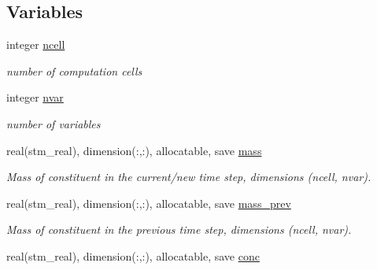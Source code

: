 \subsection*{Variables}
\begin{CompactItemize}
\item 
\hypertarget{a00070_d30ffe89b9bf19b7ebd4959610c0668e}{
integer \hyperlink{a00070_d30ffe89b9bf19b7ebd4959610c0668e}{ncell}}
\label{a00070_d30ffe89b9bf19b7ebd4959610c0668e}

\begin{CompactList}\small\item\em number of computation cells \item\end{CompactList}\item 
\hypertarget{a00070_85a0e44203c92854cc05d8525ad1d214}{
integer \hyperlink{a00070_85a0e44203c92854cc05d8525ad1d214}{nvar}}
\label{a00070_85a0e44203c92854cc05d8525ad1d214}

\begin{CompactList}\small\item\em number of variables \item\end{CompactList}\item 
\hypertarget{a00070_b3bc6dc073e275aa5cf32ffe5a9b0b6c}{
real(stm\_\-real), dimension(:,:), allocatable, save \hyperlink{a00070_b3bc6dc073e275aa5cf32ffe5a9b0b6c}{mass}}
\label{a00070_b3bc6dc073e275aa5cf32ffe5a9b0b6c}

\begin{CompactList}\small\item\em Mass of constituent in the current/new time step, dimensions (ncell, nvar). \item\end{CompactList}\item 
\hypertarget{a00070_de9ce87321125474059d20826b7835b2}{
real(stm\_\-real), dimension(:,:), allocatable, save \hyperlink{a00070_de9ce87321125474059d20826b7835b2}{mass\_\-prev}}
\label{a00070_de9ce87321125474059d20826b7835b2}

\begin{CompactList}\small\item\em Mass of constituent in the previous time step, dimensions (ncell, nvar). \item\end{CompactList}\item 
\hypertarget{a00070_b6c85eaa481ddbed256ac80cae4ac45d}{
real(stm\_\-real), dimension(:,:), allocatable, save \hyperlink{a00070_b6c85eaa481ddbed256ac80cae4ac45d}{conc}}
\label{a00070_b6c85eaa481ddbed256ac80cae4ac45d}


\end{CompactItemize}

